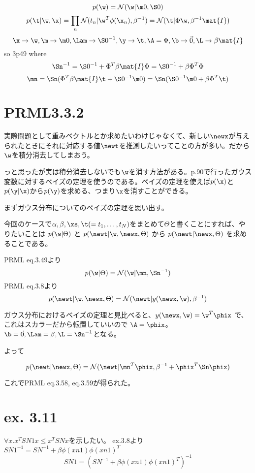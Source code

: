 \documentclass[a4paper]{jsarticle}
\newcommand{\inv}{^{-1}}
\newcommand{\Gauss}[1]{\mathcal{N}(#1)}
\begin{document}
\[ p(\w) = \Gauss{\w | \m0, \S0}\]
\[ p(\t | \w, \x) = \prod_n \Gauss{t_n | \w^T \phi(\x_n), \beta\inv} 
= \Gauss{\t | \Phi\w, \beta\inv \mat{I}}\]
\[ \x \to \w, \m \to \m0, \Lam \to \S0\inv, \y \to \t, \A = \Phi, \b \to \vec{0}, \L \to \beta \mat{I} \]
so
\eq3p49
where
\[ \Sn\inv = \S0\inv + \Phi^T \beta \mat{I} \Phi = \S0\inv + \beta \Phi^T \Phi \]
\[ \mn = \Sn(\Phi^T \beta \mat{I} \t + \S0\inv \m0) =  \Sn(\S0\inv \m0 + \beta \Phi^T \t)\]



\section{PRML3.3.2}

実際問題として重みベクトルとか求めたいわけじゃなくて、新しい$\newx$が与えられたときにそれに対応する値$\newt$を推測したいってことの方が多い。だから$\w$を積分消去してしまおう。

っと思ったが実は積分消去しないでも$\w$を消す方法がある。p.90で行ったガウス変数に対するベイズの定理を使うのである。ベイズの定理を使えば$p(\x)$と$p(\y|\x)$から$p(\y)$を求める、つまり$\x$を消すことができる。

まずガウス分布についてのベイズの定理を思い出す。
\BayesForGauss


今回のケースで$\alpha, \beta, \xs, \t (= t_1, \ldots, t_N)$をまとめて$\Theta$と書くことにすれば、やりたいことは
$ p(\w | \Theta) $ と $ p(\newt | \w, \newx, \Theta) $ から $ p(\newt | \newx, \Theta) $ を求めることである。

PRML eq.3.49より
\[ p(\w | \Theta) = \Gauss{ \w | \mn, \Sn\inv } \]
PRML eq.3.8より
\[ p(\newt | \w, \newx, \Theta) = \Gauss{\newt | y(\newx, \w), \beta\inv } \]

ガウス分布におけるベイズの定理と見比べると、$ y(\newx, \w) = \w^T \phix$ で、これはスカラーだから転置していいので  $\A = \phix$。$\b = \vec{0}, \Lam = \beta, \L = \Sn \inv$となる。

よって

\[ p(\newt | \newx, \Theta) = \Gauss{\newt | \mn^T \phix, \beta\inv + \phix^T \Sn \phix}\]

これでPRML eq.3.58, eq.3.59が得られた。


\section{ex. 3.11}
$\forall x . x^T SN1 x \le x^T SN x$を示したい。
ex.3.8より$SN1\inv = SN\inv + \beta\phi(xn1)\phi(xn1)^T$
\[ SN1 = (SN\inv + \beta\phi(xn1)\phi(xn1)^T) \inv \]
\end{document}
